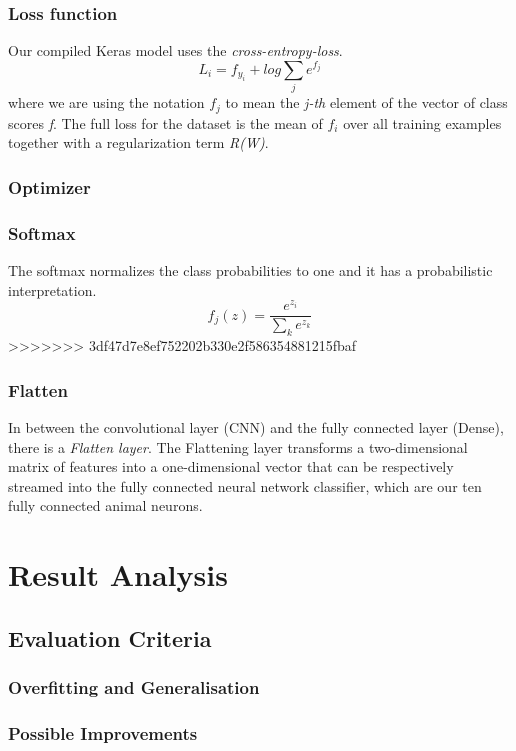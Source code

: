 \documentclass[journal]{IEEEtran}
\begin{document}
\subsubsection{Loss function}
Our compiled Keras model uses the \textit{cross-entropy-loss}. 
\begin{equation}
L_{i} = f_{y_{i}} + log \sum_{j} e^{f_{j}}
\end{equation}
where we are using the notation \(f_{j}\) to mean the \textit{j-th} element of the vector of class scores \textit{f}. The full loss for the dataset is the mean of \(f_{i}\) over all training examples together with a regularization term \textit{R(W)}.

\subsubsection{Optimizer}
\subsubsection{Softmax}
The softmax normalizes the class probabilities to one and it has a probabilistic interpretation. 
\begin{equation}
f_{j}(z) = \frac{e^{z_{i}}}{\sum_{k} e^{z_{k}}}
\end{equation}
>>>>>>> 3df47d7e8ef752202b330e2f586354881215fbaf
\subsubsection{Flatten}
In between the convolutional layer (CNN) and the fully connected layer (Dense), there is a \textit{Flatten layer}. The Flattening layer transforms a two-dimensional matrix of features into a one-dimensional vector that can be respectively streamed into the fully connected neural network classifier, which are our ten fully connected animal neurons. \\
%
%
\section{Result Analysis}
\subsection{Evaluation Criteria}
\subsubsection{Overfitting and Generalisation}
\subsubsection{Possible Improvements}
\ifCLASSOPTIONcaptionsoff
  \newpage
\fi


\vfill
\end{document}
